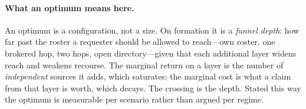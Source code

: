\paragraph{What an optimum means here.} An optimum is a configuration, not a size. On
formation it is a \emph{funnel depth}: how far past the roster a requester should be
allowed to reach---own roster, one brokered hop, two hops, open directory---given that
each additional layer widens reach and weakens recourse. The marginal return on a layer
is the number of \emph{independent} sources it adds, which saturates; the marginal cost
is what a claim from that layer is worth, which decays. The crossing is the depth. Stated
this way the optimum is measurable per scenario rather than argued per regime.
\fi
